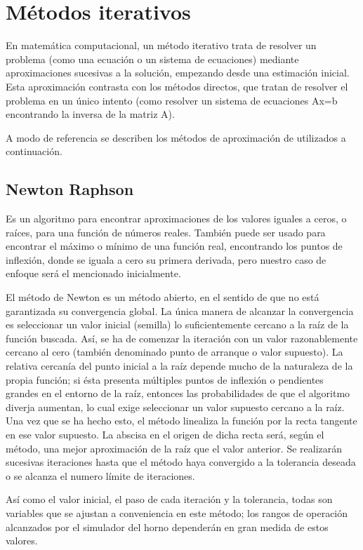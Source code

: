 \chapter{Métodos iterativos}

\par En matemática computacional, un método iterativo trata de resolver un problema (como una ecuación o un sistema de ecuaciones) mediante aproximaciones sucesivas a la solución, empezando desde una estimación inicial. Esta aproximación contrasta con los métodos directos, que tratan de resolver el problema en un único intento (como resolver un sistema de ecuaciones Ax=b encontrando la inversa de la matriz A).
\par A modo de referencia se describen los métodos de aproximación de utilizados a continuación.

\section{Newton Raphson}
\par Es un algoritmo para encontrar aproximaciones de los valores iguales a ceros, o raíces, para una función de números reales. También puede ser usado para encontrar el máximo o mínimo de una función real, encontrando los puntos de inflexión, donde se iguala a cero su primera derivada, pero nuestro caso de enfoque será el mencionado inicialmente.
\par El método de Newton es un método abierto, en el sentido de que no está garantizada su convergencia global. La única manera de alcanzar la convergencia es seleccionar un valor inicial (semilla) lo suficientemente cercano a la raíz de la función buscada. Así, se ha de comenzar la iteración con un valor razonablemente cercano al cero (también denominado punto de arranque o valor supuesto). La relativa cercanía del punto inicial a la raíz depende mucho de la naturaleza de la propia función; si ésta presenta múltiples puntos de inflexión o pendientes grandes en el entorno de la raíz, entonces las probabilidades de que el algoritmo diverja aumentan, lo cual exige seleccionar un valor supuesto cercano a la raíz. Una vez que se ha hecho esto, el método linealiza la función por la recta tangente en ese valor supuesto. La abscisa en el origen de dicha recta será, según el método, una mejor aproximación de la raíz que el valor anterior. Se realizarán sucesivas iteraciones hasta que el método haya convergido a la tolerancia deseada o se alcanza el numero límite de iteraciones. 
\par Así como el valor inicial, el paso de cada iteración y la tolerancia, todas son variables que se ajustan a conveniencia en este método; los rangos de operación alcanzados por el simulador del horno dependerán en gran medida de estos valores.
